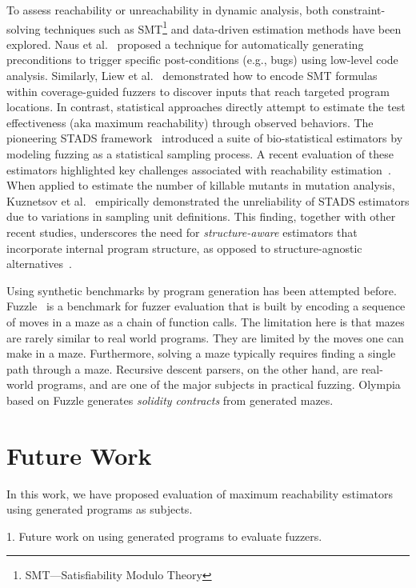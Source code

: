 \documentclass[conference,anonymous,review]{IEEEtran}
\begin{document}
To assess reachability or unreachability in dynamic analysis, both constraint-solving techniques such as SMT\footnote{SMT—Satisfiability Modulo Theory} and data-driven estimation methods have been explored. Naus et al.~\cite{naus2023low} proposed a technique for automatically generating preconditions to trigger specific post-conditions (e.g., bugs) using low-level code analysis. Similarly, Liew et al.~\cite{liew2019just} demonstrated how to encode SMT formulas within coverage-guided fuzzers to discover inputs that reach targeted program locations. In contrast, statistical approaches directly attempt to estimate the test effectiveness (aka maximum reachability) through observed behaviors. The pioneering STADS framework~\cite{boehme2018stads} introduced a suite of bio-statistical estimators by modeling fuzzing as a statistical sampling process. A recent evaluation of these estimators highlighted key challenges associated with reachability estimation~\cite{liyanage2023reachable}. When applied to estimate the number of killable mutants in mutation analysis, Kuznetsov et al.~\cite{Kuznetsov2024empirical} empirically demonstrated the unreliability of STADS estimators due to variations in sampling unit definitions. This finding, together with other recent studies, underscores the need for \emph{structure-aware} estimators that incorporate internal program structure, as opposed to structure-agnostic alternatives~\cite{lee2023statistical}.

Using synthetic benchmarks by program generation has been attempted before.
Fuzzle~\cite{lee2022fuzzle} is a benchmark for fuzzer evaluation that is built
by encoding a sequence of moves in a maze as a chain of function calls. The
limitation here is that mazes are rarely similar to real world programs.
They are limited by the moves one can make in a maze. Furthermore, solving
a maze typically requires finding a single path through a maze.
Recursive descent parsers, on the other hand, are real-world programs, and
are one of the major subjects in practical fuzzing.
Olympia~\cite{chadt2024olympia} based on Fuzzle generates \emph{solidity contracts} from generated mazes.

\section{Future Work}\label{sec:future}
In this work, we have proposed evaluation of maximum reachability estimators using
generated programs as subjects.

1. Future work on using generated programs to evaluate fuzzers.
\end{document}
